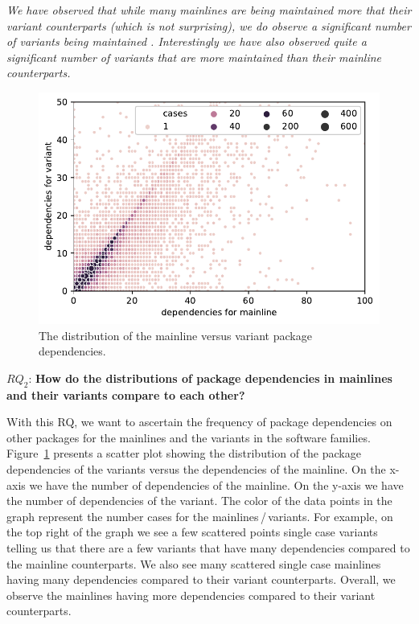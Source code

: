 \begin{framed}
\noindent
\emph{We have observed that while many mainlines are being maintained more that their variant counterparts (which is not surprising), we do observe a significant number of variants being maintained . Interestingly we have also observed quite a significant number of variants that are more  maintained than their mainline counterparts.}
\end{framed}

\begin{figure}[htbp]
\vspace{-.3cm}
   \centering
    \includegraphics[scale=0.6]{figures/benevolj_dependencies.pdf}
    \caption{The distribution of the mainline versus variant package dependencies.}
    \label{fig:dependencies}
\end{figure}


$RQ_2$: \textbf{How do the distributions of package dependencies in mainlines and their variants compare to each other?}

With this RQ, we want to ascertain the frequency of package dependencies on other packages for the mainlines and the variants in the software families. 
Figure~\ref{fig:dependencies} presents a scatter plot showing the distribution of the package dependencies of the variants versus the dependencies of the mainline.
On the x-axis we have the number of dependencies of the mainline. 
On the y-axis we have the number of dependencies of the variant.
The color of the data points in the graph represent the number cases for the mainlines\,/\,variants.
For example, on the top right of the graph we see a few scattered points single case variants telling us that there are a few variants that have many dependencies compared to the mainline counterparts.
We also see many scattered single case mainlines having many dependencies compared to their variant counterparts. 
Overall, we observe the mainlines having more dependencies compared to their variant counterparts.

